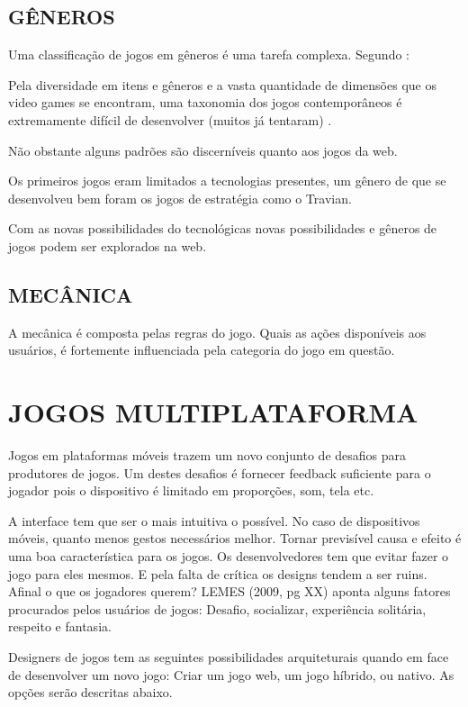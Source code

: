 \documentclass[
12pt,
a4paper,
portuges,
draft
]{report}
\renewenvironment{quote}
               {\list{}{\rightmargin\leftmargin}%
                \item\relax\fontsize{10}{12}}
               {\endlist}
\begin{document}
\subsection{GÊNEROS}

Uma classificação de jogos em gêneros é uma tarefa complexa. Segundo \autocite{gamebenefits}:

\begin{quote}
Pela diversidade  em itens e gêneros e a vasta quantidade de dimensões que os video games se encontram, uma taxonomia dos jogos contemporâneos é extremamente difícil de desenvolver (muitos já tentaram) .
\end{quote}


Não obstante alguns padrões são discerníveis quanto aos jogos da web.


Os primeiros jogos eram limitados a tecnologias presentes, um gênero de que se desenvolveu bem foram os jogos
de estratégia como o Travian.

Com as novas possibilidades do tecnológicas novas possibilidades e gêneros de jogos podem ser explorados na web.

\subsection{MECÂNICA}

A mecânica é composta pelas regras do jogo. Quais as ações
disponíveis aos usuários, é fortemente influenciada pela categoria do
jogo em questão.

\section{JOGOS MULTIPLATAFORMA}

Jogos em plataformas móveis trazem um novo conjunto de desafios para
produtores de jogos. Um destes desafios é fornecer feedback suficiente
para o jogador pois o dispositivo é limitado em proporções, som, tela
etc.

A interface tem que ser o mais intuitiva o possível. No caso de
dispositivos móveis, quanto menos gestos necessários melhor. Tornar
previsível causa e efeito é uma boa característica para os jogos.
Os desenvolvedores tem que evitar fazer o jogo para eles mesmos.
E pela falta de crítica os designs tendem a ser ruins. Afinal o
que os jogadores querem? LEMES (2009, pg XX) aponta alguns fatores procurados
pelos usuários de jogos: Desafio, socializar, experiência solitária,
respeito e fantasia.

Designers de jogos tem as seguintes possibilidades arquiteturais
quando em face de desenvolver um novo jogo: Criar um jogo web,
um jogo híbrido, ou nativo. As opções serão descritas abaixo.
\end{document}
